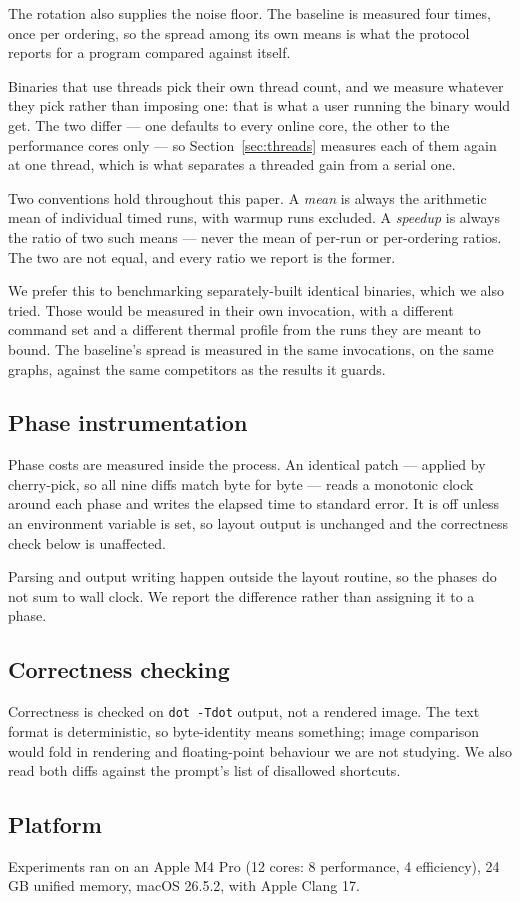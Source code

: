 The rotation also supplies the noise floor. The baseline is measured four times,
once per ordering, so the spread among its own means is what the protocol
reports for a program compared against itself.

Binaries that use threads pick their own thread count, and we measure whatever
they pick rather than imposing one: that is what a user running the binary
would get. The two differ --- one defaults to every online core, the other to
the performance cores only --- so Section~\ref{sec:threads} measures each of
them again at one thread, which is what separates a threaded gain from a serial
one.

Two conventions hold throughout this paper. A \emph{mean} is always the
arithmetic mean of individual timed runs, with warmup runs excluded. A
\emph{speedup} is always the ratio of two such means --- never the mean of
per-run or per-ordering ratios. The two are not equal, and every ratio we report
is the former.

We prefer this to benchmarking separately-built identical binaries, which we
also tried. Those would be measured in their own invocation, with a different
command set and a different thermal profile from the runs they are meant to
bound. The baseline's spread is measured in the same invocations, on the same
graphs, against the same competitors as the results it guards.

\subsection{Phase instrumentation}

Phase costs are measured inside the process. An identical patch --- applied by
cherry-pick, so all nine diffs match byte for byte --- reads a monotonic clock
around each phase and writes the elapsed time to standard error. It is off
unless an environment variable is set, so layout output is unchanged and the
correctness check below is unaffected.

Parsing and output writing happen outside the layout routine, so the phases do
not sum to wall clock. We report the difference rather than assigning it to a
phase.

\subsection{Correctness checking}

Correctness is checked on \texttt{dot -Tdot} output, not a rendered image. The
text format is deterministic, so byte-identity means something; image comparison
would fold in rendering and floating-point behaviour we are not studying. We
also read both diffs against the prompt's list of disallowed shortcuts.

\subsection{Platform}

Experiments ran on an Apple M4 Pro (12 cores: 8 performance, 4 efficiency),
24\,GB unified memory, macOS 26.5.2, with Apple Clang 17.
